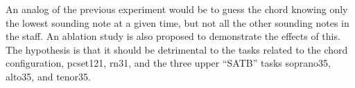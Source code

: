 
An analog of the previous experiment would be to guess the
chord knowing only the lowest sounding note at a given time,
but not all the other sounding notes in the staff. An
ablation study is also proposed to demonstrate the effects
of this. The hypothesis is that it should be detrimental to
the tasks related to the chord configuration,
\gls{pcset121}, \gls{rn31}, and the three upper ``SATB''
tasks \gls{soprano35}, \gls{alto35}, and \gls{tenor35}.
